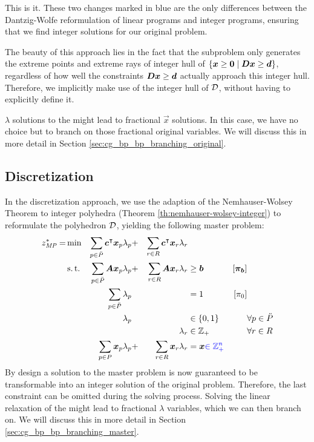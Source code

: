 This is it. These two changes marked in blue are the only differences between the Dantzig-Wolfe reformulation of linear programs and integer programs, ensuring that we find integer solutions for our original problem.

The beauty of this approach lies in the fact that the subproblem only generates the extreme points and extreme rays of integer hull of $\{{\bm{x}} \geq {\bm{0}} \mid {\bm{D}} {\bm{x}} \geq {\bm{d}}\}$, regardless of how well the constraints ${\bm{D}} {\bm{x}} \geq {\bm{d}}$ actually approach this integer hull. Therefore, we implicitly make use of the integer hull of $\mathcal{D}$, without having to explicitly define it.

$\lambda$ solutions to the \MP{} might lead to fractional $\vec{x}$ solutions. In this case, we have no choice but to branch on those fractional original variables. We will discuss this in more detail in Section \ref{sec:cg_bp_bp_branching_original}.

\subsection{Discretization}\label{sec:cg_bp_ip_discretization}
In the discretization approach, we use the adaption of the Nemhauser-Wolsey Theorem to integer polyhedra (Theorem \ref{th:nemhauser-wolsey-integer}) to reformulate the polyhedron $\mathcal{D}$, yielding the following master problem:
\begin{equation}
\begin{aligned}
z^*_{\textit{MP}}{} = &\min & \sum_{p \in \ddot{P}} {\bm{c}}^\intercal {\bm{x}}_p \lambda_p &+ &\sum_{r \in R} {\bm{c}}^\intercal {\bm{x}}_r \lambda_r & & & \\
&\operatorname{s.t.} & \sum_{p \in \ddot{P}} {\bm{A}} {\bm{x}}_p \lambda_p &+ &\sum_{r \in R} {\bm{A}} {\bm{x}}_r \lambda_r & \geq {\bm{b}} & \left[{\bm{\pi}}_{\bm{b}}\right] \\
&& \sum_{p \in \ddot{P}} \lambda_p & & & = 1 & \left[\pi_0 \right] & \\
&& \lambda_p & & & \in \{0, 1\} & & \forall p \in \ddot{P} \\
&& & & \lambda_r & \in \mathbb{Z}_+ & & \forall r \in R \\
&& \sum_{p \in P} {\bm{x}}_p \lambda_p &+ &\sum_{r \in R} {\bm{x}}_r \lambda_r & = {\bm{x}} {\color{blue} \in \mathbb{Z}_+^n} & &
\end{aligned}
\end{equation}
By design a solution to the master problem is now guaranteed to be transformable into an integer solution of the original problem. Therefore, the last constraint can be omitted during the solving process. Solving the linear relaxation of the \RMP{} might lead to fractional $\lambda$ variables, which we can then branch on. We will discuss this in more detail in Section \ref{sec:cg_bp_bp_branching_master}.

